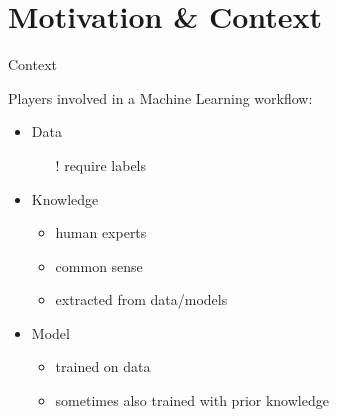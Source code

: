 \documentclass[presentation]{beamer}\mode<presentation>{\usetheme{blackAMSBolognaFC}}
\begin{document}
\section{Motivation \& Context}

\begin{frame}[c]{Context}

    Players involved in a Machine Learning workflow:
    \vspace{0.5cm}
    \begin{itemize}
        \item Data
        \begin{itemize}
            \item[!] require \alert{labels}
        \end{itemize}

        \vfill

        \item Knowledge
        \begin{itemize}
            \item human experts
            \item common sense
            \item extracted from data/models
        \end{itemize}

        \vfill

        \item Model
        \begin{itemize}
            \item trained on data
            \item sometimes also trained with prior knowledge
        \end{itemize}

    \end{itemize}
\end{frame}
\end{document}
